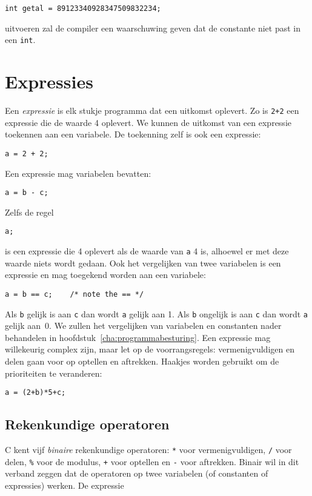 \hspace*{1em}\texttt{int getal = 89123340928347509832234;}

uitvoeren zal de compiler een waarschuwing geven dat de constante niet past in een \texttt{int}.


\section{Expressies}
Een \textsl{expressie} is elk stukje programma dat een uitkomst oplevert. Zo is \texttt{2+2} een expressie die de waarde 4 oplevert. We kunnen de uitkomst van een expressie toekennen aan een variabele. De toekenning zelf is ook een expressie:

\hspace*{1em}\texttt{a = 2 + 2;}

Een expressie mag variabelen bevatten:

\hspace*{1em}\texttt{a = b - c;}

Zelfs de regel

\hspace*{1em}\texttt{a;}

is een expressie die 4 oplevert als de waarde van \texttt{a} 4 is, alhoewel er met deze waarde niets wordt gedaan. Ook het vergelijken van twee variabelen is een expressie en mag toegekend worden aan een variabele:

\hspace*{1em}\texttt{a = b == c; \ \ \  /* note the == */}

Als \texttt{b} gelijk is aan \texttt{c} dan wordt \texttt{a} gelijk aan 1. Als \texttt{b} ongelijk is aan \texttt{c} dan wordt \texttt{a} gelijk aan~0. We zullen het vergelijken van variabelen en constanten nader behandelen in hoofdstuk~\ref{cha:programmabesturing}.
%
Een expressie mag willekeurig complex zijn, maar let op de voorrangsregels: vermenigvuldigen en delen gaan voor op optellen en aftrekken. Haakjes worden gebruikt om de prioriteiten te veranderen:

\hspace*{1em}\texttt{a = (2+b)*5+c;}

\subsection{Rekenkundige operatoren}
C kent vijf \textsl{binaire} rekenkundige operatoren: \texttt{*} voor vermenigvuldigen, \texttt{/} voor delen, \texttt{\%} voor de modulus, \texttt{+} voor optellen en \texttt{-} voor aftrekken. Binair wil in dit verband zeggen dat de operatoren op twee variabelen (of constanten of expressies) werken. 
De expressie

